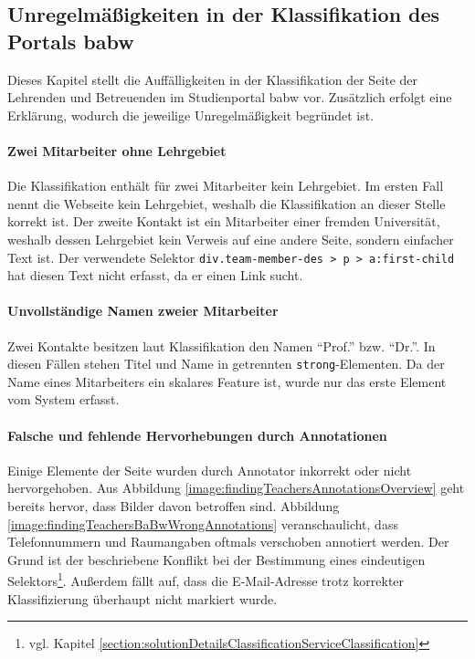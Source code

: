 \subsection{Unregelmäßigkeiten in der Klassifikation des Portals \acrshort{babw}}
    \label{section:findingsTeachersAbnormalitiesBabw}
    Dieses Kapitel stellt die Auffälligkeiten in der Klassifikation
    der Seite der Lehrenden und Betreuenden im Studienportal
    \gls{babw} vor.
    Zusätzlich erfolgt eine Erklärung,
    wodurch die jeweilige Unregelmäßigkeit begründet ist.

    \paragraph{Zwei Mitarbeiter ohne Lehrgebiet}
    Die Klassifikation enthält für zwei Mitarbeiter kein Lehrgebiet.
    Im ersten Fall nennt die Webseite kein Lehrgebiet,
    weshalb die Klassifikation an dieser Stelle korrekt ist.
    Der zweite Kontakt ist ein Mitarbeiter einer fremden Universität,
    weshalb dessen Lehrgebiet kein Verweis auf eine andere Seite,
    sondern einfacher Text ist.
    Der verwendete Selektor \texttt{div.team-member-des > p > a:first-child}
    hat diesen Text nicht erfasst, da er einen Link sucht.

    \paragraph{Unvollständige Namen zweier Mitarbeiter}
    Zwei Kontakte besitzen laut Klassifikation den Namen "`Prof."' bzw. "`Dr."'.
    In diesen Fällen stehen Titel und Name in getrennten \texttt{strong}-Elementen.
    Da der Name eines Mitarbeiters ein skalares Feature ist,
    wurde nur das erste Element vom System erfasst.

    \paragraph{Falsche und fehlende Hervorhebungen durch Annotationen}
    Einige Elemente der Seite wurden durch Annotator inkorrekt oder nicht hervorgehoben.
    Aus Abbildung \ref{image:findingTeachersAnnotationsOverview} geht bereits hervor,
    dass Bilder davon betroffen sind.
    Abbildung \ref{image:findingTeachersBaBwWrongAnnotations}
    veranschaulicht, dass Telefonnummern und Raumangaben oftmals verschoben annotiert werden.
    Der Grund ist der
    beschriebene Konflikt bei der Bestimmung eines eindeutigen
    Selektors\footnote{vgl. Kapitel \ref{section:solutionDetailsClassificationServiceClassification}}.
    Außerdem fällt auf, dass die E-Mail-Adresse trotz korrekter Klassifizierung
    überhaupt nicht markiert wurde.

